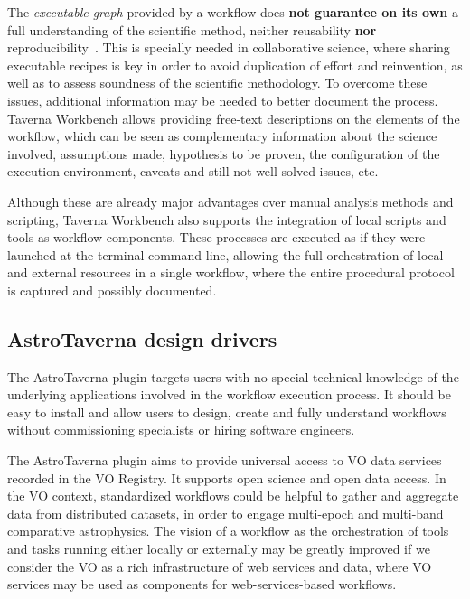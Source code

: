 \documentclass{aa}
\begin{document}
The \textit{executable graph} provided by a workflow does \textbf{not guarantee on its own} a full understanding of the scientific method, neither reusability \textbf{nor} reproducibility~\textbf{\citep{WfRO:SePublica2012}}. This is specially needed in collaborative science, where sharing executable recipes is key in order to avoid duplication of effort and reinvention, as well as to assess soundness of the scientific methodology. To overcome these issues, additional information may be needed to better document the process. Taverna Workbench allows providing free-text descriptions on the elements of the workflow, which can be seen as complementary information about the science involved, assumptions made, hypothesis to be proven, the configuration of the execution environment, caveats and still not well solved issues, etc.

Although these are already major advantages over manual analysis methods and scripting, Taverna Workbench also supports the integration of local scripts and tools as workflow components. These processes are executed as if they were launched at the terminal command line, allowing the full orchestration of local and external resources in a single workflow, where the entire procedural protocol is captured and possibly documented. 


\subsection{AstroTaverna design drivers}
\label{Drivers}

The AstroTaverna plugin targets users with no special technical knowledge of the underlying applications involved in the workflow execution process. It should be easy to install and allow users to design, create and fully understand workflows without commissioning specialists or hiring software engineers. 

The AstroTaverna plugin aims to provide universal access to VO data services recorded in the VO Registry. It supports open science and open data access. In the VO context, standardized workflows could be helpful to gather and aggregate data from distributed datasets, in order to engage multi-epoch and multi-band comparative astrophysics. The vision of a workflow as the orchestration of tools and tasks running either locally or externally may be greatly improved if we consider the VO as a rich infrastructure of web services and data, where VO services may be used as components for web-services-based workflows. 
\end{document}
